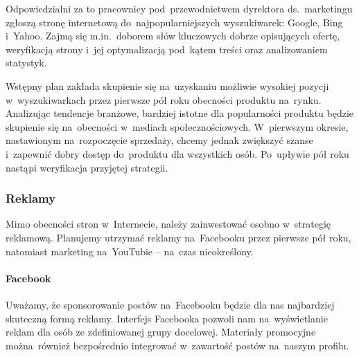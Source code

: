 \documentclass[12pt]{article}
\begin{document}
Odpowiedzialni za to pracownicy pod~przewodnictwem dyrektora ds.~marketingu zgłoszą stronę internetową do~najpopularniejszych wyszukiwarek: Google, Bing i~Yahoo.
Zajmą się m.in.~doborem słów kluczowych dobrze opisujących ofertę, weryfikacją strony i~jej optymalizacją pod~kątem treści oraz analizowaniem statystyk.

Wstępny plan zakłada skupienie się na~uzyskaniu możliwie wysokiej pozycji w~wyszukiwarkach przez pierwsze pół roku obecności produktu na~rynku.
Analizując tendencje branżowe, bardziej istotne dla popularności produktu będzie skupienie się na~obecności w~mediach społecznościowych.
W~pierwszym okresie, nastawionym na~rozpoczęcie sprzedaży, chcemy jednak zwiększyć szanse i~zapewnić dobry dostęp do~produktu dla wszystkich osób.
Po~upływie pół roku nastąpi weryfikacja przyjętej strategii.


\subsubsection{Reklamy}

Mimo obecności stron w~Internecie, należy zainwestować osobno w~strategię reklamową.
Planujemy utrzymać reklamy na~Facebooku przez pierwsze pół roku, natomiast marketing na~YouTubie -- na~czas nieokreślony.

\paragraph{Facebook}

Uważamy, że sponsorowanie postów na~Facebooku będzie dla nas najbardziej skuteczną formą reklamy.
Interfejs Facebooka pozwoli nam na~wyświetlanie reklam dla osób ze zdefiniowanej grupy docelowej.
Materiały promocyjne można~również bezpośrednio integrować w~zawartość postów na~naszym profilu.
\end{document}
